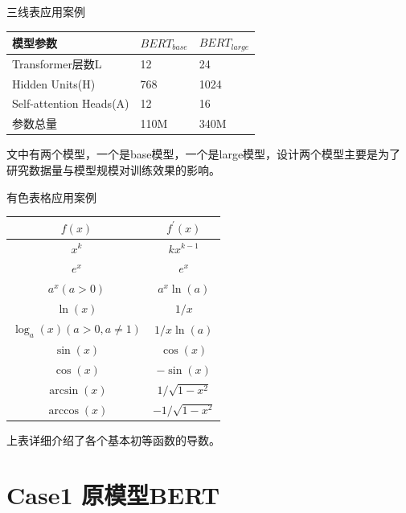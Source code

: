 \documentclass[UTF-8,fontset = none]{ctexbeamer}
\begin{document}
\begin{frame}{三线表应用案例}
    \begin{table}[htpb]
        \centering
        \label{tab:BERTModel}
        \begin{tabular}{lll}
            \toprule
            模型参数 & $BERT_{base}$ & $BERT_{large}$ \\ 
            \midrule
            Transformer层数L & 12 & 24 \\
            Hidden Units(H) & 768 & 1024 \\
            Self-attention Heads(A) & 12 & 16 \\
            参数总量 & 110M & 340M\\ 
            \bottomrule
        \end{tabular}
    \end{table}
    文中有两个模型，一个是base模型，一个是large模型，设计两个模型主要是为了研究数据量与模型规模对训练效果的影响。
\end{frame}

\begin{frame}{有色表格应用案例}
    \begin{table}[htbp]
        \centering
        \begin{tabular}{c|c}
        \hline
        $f(x)$           & $f^{\prime}(x)$    \\ \hline
        $x^k$            &  $kx^{k-1}$        \\
        $e^x$            & $e^x$              \\
        $a^x(a>0)$       & $a^{x}\ln(a)$      \\
        $\ln(x)$         & $1/x$              \\
        $\log_{a}(x)(a>0,a\neq 1)$   & $1/x\ln(a)$  \\                                                                                      
        $\sin(x)$        & $\cos(x)$          \\
        $\cos(x)$        & $-\sin(x)$         \\
        $\arcsin(x)$     & $1/\sqrt{1-x^2}$   \\
        $\arccos(x)$     & $-1/\sqrt{1-x^2}$  \\ \hline
        \end{tabular}
        \label{tab:deriva}
    \end{table}
    上表详细介绍了各个基本初等函数的导数。
\end{frame}

\section{Case1 原模型BERT}
\end{document}
